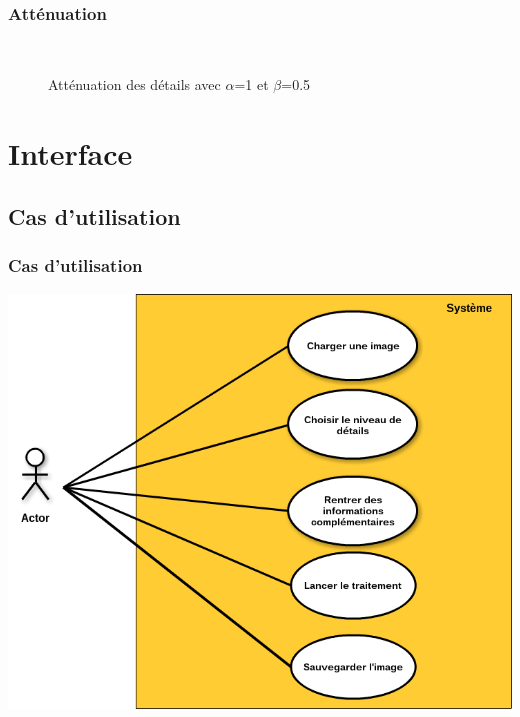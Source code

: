 \documentclass[compress]{beamer}
\begin{document}
\begin{frame}\frametitle{Atténuation}

\begin{figure}
        \centering
		~
        \caption{Atténuation des détails avec $\alpha$=1 et $\beta$=0.5}
\end{figure}

\end{frame}

\section{Interface}
\subsection{Cas d'utilisation}
\begin{frame}\frametitle{Cas d'utilisation}
	\center
	\includegraphics[scale=0.3]{images/UseCase.png}
\end{frame}
\end{document}
